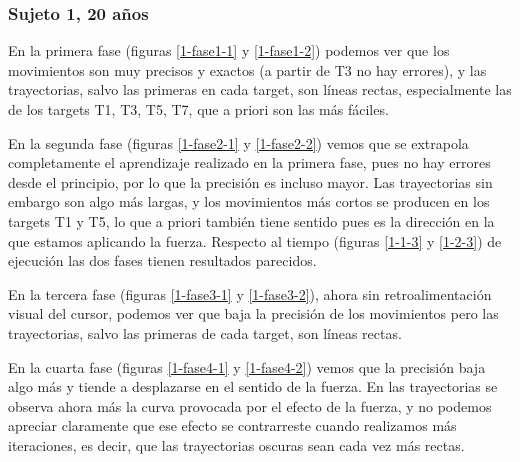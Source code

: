 \documentclass[a4paper,11pt, oneside]{book}
\begin{document}
\subsubsection{Sujeto 1, 20 años}

En la primera fase (figuras \ref{1-fase1-1} y \ref{1-fase1-2}) podemos ver que los movimientos son muy precisos y exactos (a partir de T3 no hay errores), y las trayectorias, salvo las primeras en cada target, son líneas rectas, especialmente las de los targets T1, T3, T5, T7, que a priori son las más fáciles.

En la segunda fase (figuras \ref{1-fase2-1} y \ref{1-fase2-2}) vemos que se extrapola completamente el aprendizaje realizado en la primera fase, pues no hay errores desde el principio, por lo que la precisión es incluso mayor. Las trayectorias sin embargo son algo más largas, y los movimientos más cortos se producen en los targets T1 y T5, lo que a priori también tiene sentido pues es la dirección en la que estamos aplicando la fuerza. Respecto al tiempo (figuras \ref{1-1-3} y \ref{1-2-3}) de ejecución las dos fases tienen resultados parecidos.

En la tercera fase (figuras \ref{1-fase3-1} y \ref{1-fase3-2}), ahora sin retroalimentación visual del cursor, podemos ver que baja la precisión de los movimientos pero las trayectorias, salvo las primeras de cada target, son líneas rectas.

En la cuarta fase (figuras \ref{1-fase4-1} y \ref{1-fase4-2}) vemos que la precisión baja algo más y tiende a desplazarse en el sentido de la fuerza. En las trayectorias se observa ahora más la curva provocada por el  efecto de la fuerza, y no podemos apreciar claramente que ese efecto se contrarreste cuando realizamos más iteraciones, es decir, que las trayectorias oscuras sean cada vez más rectas.
\end{document}
